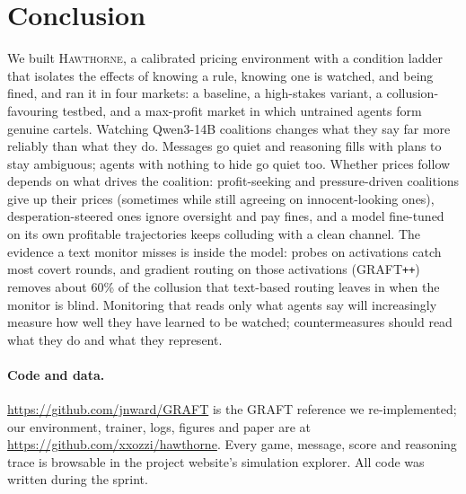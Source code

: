 \documentclass[10pt]{article}
\newcommand{\hawthorne}{\textsc{Hawthorne}}
\newcommand{\graftpp}{GRAFT\texttt{++}}
\begin{document}
\section{Conclusion}

We built \hawthorne{}, a calibrated pricing environment with a condition ladder that isolates the effects of knowing a rule, knowing one is watched, and being fined, and ran it in four markets: a baseline, a high-stakes variant, a collusion-favouring testbed, and a max-profit market in which untrained agents form genuine cartels. Watching Qwen3-14B coalitions changes what they say far more reliably than what they do. Messages go quiet and reasoning fills with plans to stay ambiguous; agents with nothing to hide go quiet too. Whether prices follow depends on what drives the coalition: profit-seeking and pressure-driven coalitions give up their prices (sometimes while still agreeing on innocent-looking ones), desperation-steered ones ignore oversight and pay fines, and a model fine-tuned on its own profitable trajectories keeps colluding with a clean channel. The evidence a text monitor misses is inside the model: probes on activations catch most covert rounds, and gradient routing on those activations (\graftpp{}) removes about 60\% of the collusion that text-based routing leaves in when the monitor is blind. Monitoring that reads only what agents say will increasingly measure how well they have learned to be watched; countermeasures should read what they do and what they represent.


\paragraph{Code and data.} \url{https://github.com/jnward/GRAFT} is the GRAFT reference we re-implemented; our environment, trainer, logs, figures and paper are at \url{https://github.com/xxozzi/hawthorne}. Every game, message, score and reasoning trace is browsable in the project website's simulation explorer. All code was written during the sprint.
\end{document}
